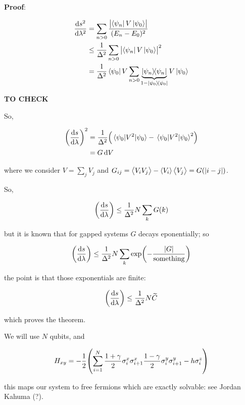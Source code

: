 \documentclass[main.tex]{subfiles}
\begin{document}
\begin{greenbox}
  \textbf{Proof}:

  \begin{subequations}
  \begin{align}
    \dv{s^2}{\lambda^2}  &= \sum _{n>0}  \frac{\abs{\bra{\psi_n} V \ket{\psi_0}}}{(E_n - E_0)^2}  \\
    &\leq \frac{1}{\Delta^2} \sum _{n>0} \abs{\bra{\psi_n} V \ket{\psi_0}}^2  \\
    &=  \frac{1}{\Delta^2} \bra{\psi_0} V   \sum _{n>0} \underbrace{\dyad{\psi_n}}_{\substack{1 - \ketbra{\psi_0}{\psi_0}}} V \ket{\psi_0}
  \end{align}
  \end{subequations}

  \textbf{TO CHECK}

  So,

  \begin{subequations}
  \begin{align}
    \qty(\dv{s}{\lambda})^2  &=  \frac{1}{\Delta^2} \qty(\ev{V^2}{\psi_0} - \ev{V^2}{\psi_0}^2)  \\
    &= G \dd{V}
  \end{align}
  \end{subequations}

  where we consider \(V = \sum _{j}  V_j \) and \(G _{ij} = \expval{V_i V_j} - \expval{V_i} \expval{V_j} = G(\abs{i-j} ) \).

  So,

  \begin{equation}
    \qty(\dv{s}{\lambda} ) \leq \frac{1}{\Delta^2} N \sum _{k} G(k)
  \end{equation}

  but it is known that for gapped systems \(G\) decays eponentially; so

  \begin{equation}
    \qty(\dv{s}{\lambda} ) \leq \frac{1}{\Delta^2} N \sum _{k} \exp(-\frac{\abs{G}}{\text{something}}  )
  \end{equation}

  the point is that those exponentials are finite:

  \begin{equation}
    \qty(\dv{s}{\lambda} ) \leq \frac{1}{\Delta^2} N \widetilde{C}
  \end{equation}

  which proves the theorem.
\end{greenbox}

We will use \(N\) qubits, and

\begin{equation}
  H_{xy} = -\frac{1}{2} \qty(\sum _{i=1}   ^{N} \frac{1 + \gamma}{2} \sigma_i ^x \sigma_{i+1}^x \frac{1-\gamma}{2} \sigma^y_i \sigma_{i+1}^y - h \sigma_i^{z} )
\end{equation}

this maps our system to free fermions which are exactly solvable: see Jordan Kahuma (?).
\end{document}

